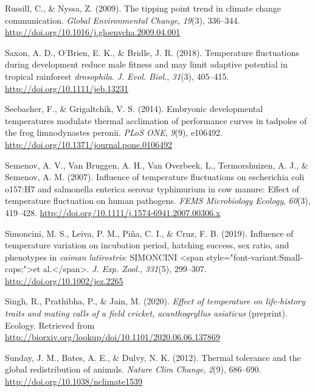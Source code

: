 \documentclass[12pt,twoside]{reedthesis}
\begin{document}
\leavevmode\hypertarget{ref-russill_tipping_2009}{}%
Russill, C., \& Nyssa, Z. (2009). The tipping point trend in climate change communication. \emph{Global Environmental Change}, \emph{19}(3), 336--344. \url{http://doi.org/10.1016/j.gloenvcha.2009.04.001}

\leavevmode\hypertarget{ref-saxon_temperature_2018-1}{}%
Saxon, A. D., O'Brien, E. K., \& Bridle, J. R. (2018). Temperature fluctuations during development reduce male fitness and may limit adaptive potential in tropical rainforest \emph{drosophila}. \emph{J. Evol. Biol.}, \emph{31}(3), 405--415. \url{http://doi.org/10.1111/jeb.13231}

\leavevmode\hypertarget{ref-seebacher_embryonic_2014}{}%
Seebacher, F., \& Grigaltchik, V. S. (2014). Embryonic developmental temperatures modulate thermal acclimation of performance curves in tadpoles of the frog limnodynastes peronii. \emph{PLoS ONE}, \emph{9}(9), e106492. \url{http://doi.org/10.1371/journal.pone.0106492}

\leavevmode\hypertarget{ref-semenov_influence_2007}{}%
Semenov, A. V., Van Bruggen, A. H., Van Overbeek, L., Termorshuizen, A. J., \& Semenov, A. M. (2007). Influence of temperature fluctuations on escherichia coli o157:H7 and salmonella enterica serovar typhimurium in cow manure: Effect of temperature fluctuation on human pathogens. \emph{FEMS Microbiology Ecology}, \emph{60}(3), 419--428. \url{http://doi.org/10.1111/j.1574-6941.2007.00306.x}

\leavevmode\hypertarget{ref-simoncini_influence_2019}{}%
Simoncini, M. S., Leiva, P. M., Piña, C. I., \& Cruz, F. B. (2019). Influence of temperature variation on incubation period, hatching success, sex ratio, and phenotypes in \emph{caiman latirostris}: SIMONCINI \textless{}span style="font-variant:Small-caps;"\textgreater{}et al.\textless{}/span\textgreater{}. \emph{J. Exp. Zool.}, \emph{331}(5), 299--307. \url{http://doi.org/10.1002/jez.2265}

\leavevmode\hypertarget{ref-singh_effect_2020}{}%
Singh, R., Prathibha, P., \& Jain, M. (2020). \emph{Effect of temperature on life-history traits and mating calls of a field cricket, \textup{acanthogryllus asiaticus}} (preprint). Ecology. Retrieved from \url{http://biorxiv.org/lookup/doi/10.1101/2020.06.06.137869}

\leavevmode\hypertarget{ref-sunday_thermal_2012}{}%
Sunday, J. M., Bates, A. E., \& Dulvy, N. K. (2012). Thermal tolerance and the global redistribution of animals. \emph{Nature Clim Change}, \emph{2}(9), 686--690. \url{http://doi.org/10.1038/nclimate1539}
\end{document}
